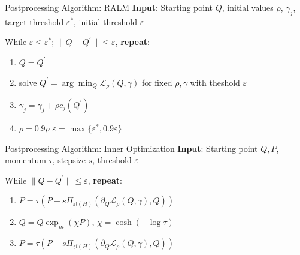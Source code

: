 \documentclass[10.5pt, aspectratio=169]{beamer} %
\begin{document}
\begin{frame}{Postprocessing Algorithm: RALM}
\textbf{Input}: Starting point $Q$, initial values $\rho$, $\gamma_{j}$, target threshold $\varepsilon^*$, initial threshold $\varepsilon$

\bigskip

While $\varepsilon \leq \varepsilon^*$; $\|Q - Q^\prime\| \leq \varepsilon$, \textbf{repeat}:

\bigskip
\begin{enumerate}
	\setlength{\itemsep}{1.5em}
	\item $Q = Q^\prime$ 
	\item	solve $Q^\prime = \arg\min_Q \mathcal L_\rho(Q, \gamma)$ for fixed $\rho, \gamma$ with theshold $\varepsilon$  	
	\item $\gamma_j = \gamma_j + \rho c_j(Q^\prime)$
	\item $\rho = 0.9 \rho$ $\varepsilon = \max\{\varepsilon^*, 0.9 \varepsilon\}$
	\end{enumerate}
\end{frame}



\begin{frame}{Postprocessing Algorithm: Inner Optimization}
\textbf{Input}: Starting point $Q, P$, momentum $\tau$, stepsize $s$, threshold $\varepsilon$

\bigskip

While $\|Q - Q^\prime\| \leq \varepsilon$, \textbf{repeat}:

\bigskip
\begin{enumerate}
	\setlength{\itemsep}{1.5em}
	\item $P = \tau \left(P - s \Pi_{\mathfrak {sl}(H)}(\partial_Q \mathcal L_\rho(Q, \gamma), Q)\right)$
	\item	$Q = Q \exp_m(\chi P )$, $\chi = \cosh(- \log \tau)$
	\item	$P = \tau \left(P - s \Pi_{\mathfrak {sl}(H)}(\partial_Q \mathcal L_\rho(Q, \gamma), Q)\right)$ 
\end{enumerate}
\end{frame}
\end{document}
